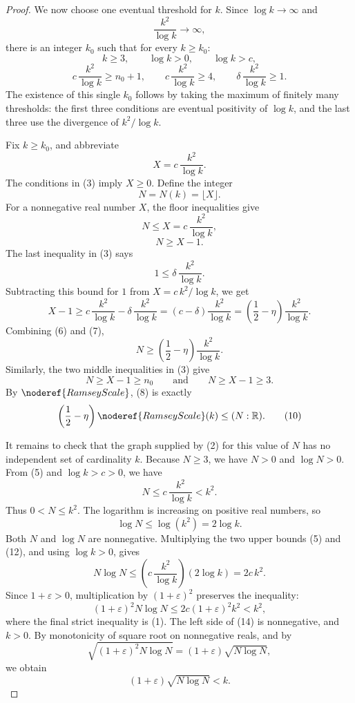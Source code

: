 \begin{proof}
We now choose one eventual threshold for \(k\).  Since \(\log k\to\infty\) and
\[
\frac{k^2}{\log k}\to\infty,
\]
there is an integer \(k_0\) such that for every \(k\ge k_0\):
\[
k\ge3,\qquad \log k>0,\qquad \log k>c,
\]
\[
c\,\frac{k^2}{\log k}\ge n_0+1,\qquad
c\,\frac{k^2}{\log k}\ge4,\qquad
\delta\,\frac{k^2}{\log k}\ge1. \tag{3}
\]
The existence of this single \(k_0\) follows by taking the maximum of finitely
many thresholds: the first three conditions are eventual positivity of
\(\log k\), and the last three use the divergence of \(k^2/\log k\).

Fix \(k\ge k_0\), and abbreviate
\[
X=c\,\frac{k^2}{\log k}.
\]
The conditions in (3) imply \(X\ge0\).  Define the integer
\[
N=N(k)=\lfloor X\rfloor. \tag{4}
\]
For a nonnegative real number \(X\), the floor inequalities give
\[
N\le X=c\,\frac{k^2}{\log k}, \tag{5}
\]
\[
N\ge X-1. \tag{6}
\]
The last inequality in (3) says
\[
1\le \delta\,\frac{k^2}{\log k}.
\]
Subtracting this bound for \(1\) from \(X=c\,k^2/\log k\), we get
\[
X-1\ge
c\,\frac{k^2}{\log k}-\delta\,\frac{k^2}{\log k}
= (c-\delta)\frac{k^2}{\log k}
=\left(\frac12-\eta\right)\frac{k^2}{\log k}. \tag{7}
\]
Combining (6) and (7),
\[
N\ge
\left(\frac12-\eta\right)\frac{k^2}{\log k}. \tag{8}
\]
Similarly, the two middle inequalities in (3) give
\[
N\ge X-1\ge n_0
\qquad\text{and}\qquad
N\ge X-1\ge3. \tag{9}
\]
By \(\noderef{RamseyScale}\), (8) is exactly
\[
\left(\frac12-\eta\right)\noderef{RamseyScale}(k)\le (N:\mathbb R).
\tag{10}
\]

It remains to check that the graph supplied by (2) for this value of \(N\) has
no independent set of cardinality \(k\).  Because \(N\ge3\), we have \(N>0\)
and \(\log N>0\).  From (5) and \(\log k>c>0\), we have
\[
N\le c\,\frac{k^2}{\log k}<k^2. \tag{11}
\]
Thus \(0<N\le k^2\).  The logarithm is increasing on positive real numbers, so
\[
\log N\le \log(k^2)=2\log k. \tag{12}
\]
Both \(N\) and \(\log N\) are nonnegative.  Multiplying the two upper bounds
(5) and (12), and using \(\log k>0\), gives
\[
N\log N
\le
\left(c\,\frac{k^2}{\log k}\right)(2\log k)
=2c\,k^2. \tag{13}
\]
Since \(1+\varepsilon>0\), multiplication by \((1+\varepsilon)^2\) preserves
the inequality:
\[
(1+\varepsilon)^2N\log N
\le 2c(1+\varepsilon)^2k^2
<k^2, \tag{14}
\]
where the final strict inequality is (1).  The left side of (14) is
nonnegative, and \(k>0\).  By monotonicity of square root on nonnegative reals,
and by
\[
\sqrt{(1+\varepsilon)^2N\log N}
=(1+\varepsilon)\sqrt{N\log N},
\]
we obtain
\[
(1+\varepsilon)\sqrt{N\log N}<k. \tag{15}
\]


\end{proof}
